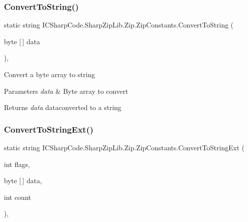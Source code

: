 \subsubsection{\texorpdfstring{Convert\+To\+String()}{ConvertToString()}\hspace{0.1cm}{\footnotesize\ttfamily [4/4]}}
{\footnotesize\ttfamily static string I\+C\+Sharp\+Code.\+Sharp\+Zip\+Lib.\+Zip.\+Zip\+Constants.\+Convert\+To\+String (\begin{DoxyParamCaption}\item[{byte \mbox{[}$\,$\mbox{]}}]{data }\end{DoxyParamCaption})\hspace{0.3cm}{\ttfamily [inline]}, {\ttfamily [static]}}



Convert a byte array to string 


\begin{DoxyParams}{Parameters}
{\em data} & Byte array to convert \\
\hline
\end{DoxyParams}
\begin{DoxyReturn}{Returns}
{\itshape data} dataconverted to a string 
\end{DoxyReturn}
\mbox{\label{class_i_c_sharp_code_1_1_sharp_zip_lib_1_1_zip_1_1_zip_constants_a8c21dda28bd9df475755e3e534eb33cf}} 
\subsubsection{\texorpdfstring{Convert\+To\+String\+Ext()}{ConvertToStringExt()}\hspace{0.1cm}{\footnotesize\ttfamily [1/4]}}
{\footnotesize\ttfamily static string I\+C\+Sharp\+Code.\+Sharp\+Zip\+Lib.\+Zip.\+Zip\+Constants.\+Convert\+To\+String\+Ext (\begin{DoxyParamCaption}\item[{int}]{flags,  }\item[{byte \mbox{[}$\,$\mbox{]}}]{data,  }\item[{int}]{count }\end{DoxyParamCaption})\hspace{0.3cm}{\ttfamily [inline]}, {\ttfamily [static]}}




